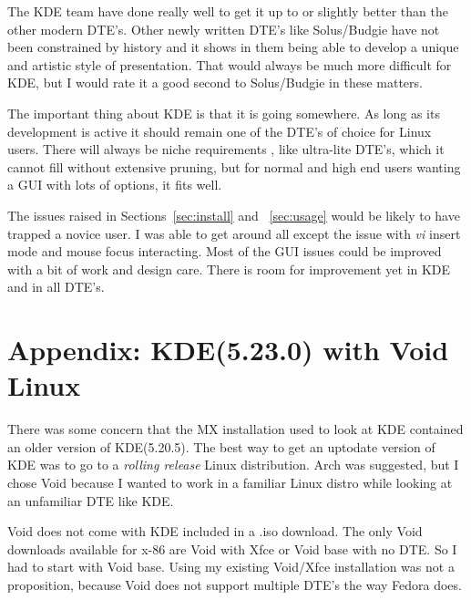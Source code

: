 \documentclass{article}  %
\begin{document}
The KDE team have done really well to get it up to or slightly better than the other modern DTE's. Other newly written DTE's like Solus/Budgie have not been constrained by history and it shows in them being able to develop a unique and artistic style of presentation. That would always be much more difficult for KDE, but I would rate it a good second to Solus/Budgie in these matters.

The important thing about KDE is that it is going somewhere. As long as its development is active it should remain one of the DTE's of choice for Linux users.  There will always be niche requirements , like ultra-lite DTE's, which it cannot fill without extensive pruning, but for normal and high end users wanting a GUI with lots of options, it fits well. 

The issues raised in Sections~\ref{sec:install} and ~\ref{sec:usage} would be likely to have trapped a novice user.  I was able to get around all except the issue with {\em vi} insert mode and mouse focus interacting. Most of the GUI issues could be improved with a bit of work and design care. There is room for improvement yet in KDE and in all DTE's.
 
\appendix
\section{Appendix: KDE(5.23.0) with Void Linux}
There was some concern that the MX installation used to look at KDE contained an older version of KDE(5.20.5).  The best way to get an uptodate version of KDE was to go to a {\em rolling release} Linux distribution. Arch was suggested, but I chose Void because I wanted to work in a familiar Linux distro while looking at an unfamiliar DTE like KDE. 

Void does not come with KDE included in a .iso download. The only Void downloads available for x-86 are Void with Xfce or Void base with no DTE. So I had to start with Void base. Using my existing Void/Xfce installation was not a proposition, because Void does not support  multiple DTE's the way Fedora does.
\end{document}
